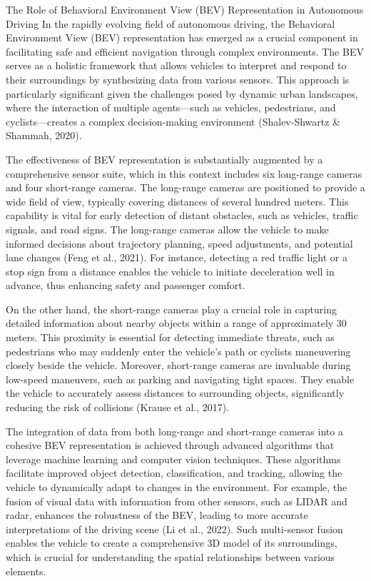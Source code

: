 The Role of Behavioral Environment View (BEV) Representation in Autonomous Driving
In the rapidly evolving field of autonomous driving, the Behavioral Environment View (BEV) representation has emerged as a crucial component in facilitating safe and efficient navigation through complex environments. The BEV serves as a holistic framework that allows vehicles to interpret and respond to their surroundings by synthesizing data from various sensors. This approach is particularly significant given the challenges posed by dynamic urban landscapes, where the interaction of multiple agents—such as vehicles, pedestrians, and cyclists—creates a complex decision-making environment (Shalev-Shwartz & Shammah, 2020).

The effectiveness of BEV representation is substantially augmented by a comprehensive sensor suite, which in this context includes six long-range cameras and four short-range cameras. The long-range cameras are positioned to provide a wide field of view, typically covering distances of several hundred meters. This capability is vital for early detection of distant obstacles, such as vehicles, traffic signals, and road signs. The long-range cameras allow the vehicle to make informed decisions about trajectory planning, speed adjustments, and potential lane changes (Feng et al., 2021). For instance, detecting a red traffic light or a stop sign from a distance enables the vehicle to initiate deceleration well in advance, thus enhancing safety and passenger comfort.

On the other hand, the short-range cameras play a crucial role in capturing detailed information about nearby objects within a range of approximately 30 meters. This proximity is essential for detecting immediate threats, such as pedestrians who may suddenly enter the vehicle's path or cyclists maneuvering closely beside the vehicle. Moreover, short-range cameras are invaluable during low-speed maneuvers, such as parking and navigating tight spaces. They enable the vehicle to accurately assess distances to surrounding objects, significantly reducing the risk of collisions (Krause et al., 2017).

The integration of data from both long-range and short-range cameras into a cohesive BEV representation is achieved through advanced algorithms that leverage machine learning and computer vision techniques. These algorithms facilitate improved object detection, classification, and tracking, allowing the vehicle to dynamically adapt to changes in the environment. For example, the fusion of visual data with information from other sensors, such as LIDAR and radar, enhances the robustness of the BEV, leading to more accurate interpretations of the driving scene (Li et al., 2022). Such multi-sensor fusion enables the vehicle to create a comprehensive 3D model of its surroundings, which is crucial for understanding the spatial relationships between various elements.

